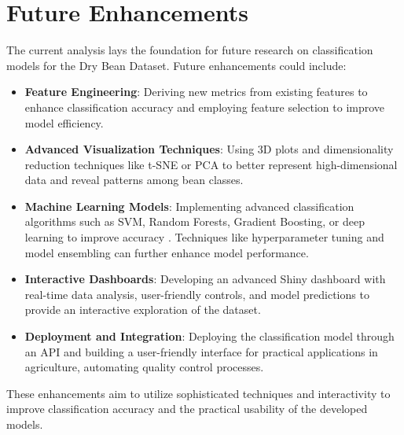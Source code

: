 \documentclass[a4paper,12pt]{article}
\begin{document}
\section{Future Enhancements}
The current analysis lays the foundation for future research on classification models for the Dry Bean Dataset. Future enhancements could include:
\begin{itemize}
    \item \textbf{Feature Engineering}: Deriving new metrics from existing features to enhance classification accuracy and employing feature selection to improve model efficiency.
    
    \item \textbf{Advanced Visualization Techniques}: Using 3D plots and dimensionality reduction techniques like t-SNE or PCA to better represent high-dimensional data and reveal patterns among bean classes.

    \item \textbf{Machine Learning Models}: Implementing advanced classification algorithms such as SVM, Random Forests, Gradient Boosting, or deep learning to improve accuracy \cite{khan2023comparison}. Techniques like hyperparameter tuning and model ensembling can further enhance model performance.

    \item \textbf{Interactive Dashboards}: Developing an advanced Shiny dashboard with real-time data analysis, user-friendly controls, and model predictions to provide an interactive exploration of the dataset.

    \item \textbf{Deployment and Integration}: Deploying the classification model through an API and building a user-friendly interface for practical applications in agriculture, automating quality control processes.
\end{itemize}

These enhancements aim to utilize sophisticated techniques and interactivity to improve classification accuracy and the practical usability of the developed models.

\newpage


\end{document}
